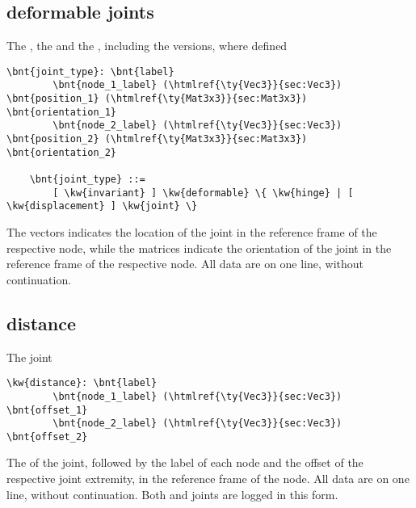 \subsection{deformable joints}
The , the 
and the , including the 
versions, where defined
\begin{Verbatim}[commandchars=\\\{\}]
    \bnt{joint_type}: \bnt{label}
        \bnt{node_1_label} (\htmlref{\ty{Vec3}}{sec:Vec3}) \bnt{position_1} (\htmlref{\ty{Mat3x3}}{sec:Mat3x3}) \bnt{orientation_1}
        \bnt{node_2_label} (\htmlref{\ty{Vec3}}{sec:Vec3}) \bnt{position_2} (\htmlref{\ty{Mat3x3}}{sec:Mat3x3}) \bnt{orientation_2}

    \bnt{joint_type} ::=
        [ \kw{invariant} ] \kw{deformable} \{ \kw{hinge} | [ \kw{displacement} ] \kw{joint} \}
\end{Verbatim}
The  vectors indicates the location of the joint
in the reference frame of the respective node,
while the  matrices indicate the orientation of the joint
in the reference frame of the respective node.
All data are on one line, without continuation.

\subsection{distance}
The  joint
\begin{Verbatim}[commandchars=\\\{\}]
    \kw{distance}: \bnt{label}
        \bnt{node_1_label} (\htmlref{\ty{Vec3}}{sec:Vec3}) \bnt{offset_1}
        \bnt{node_2_label} (\htmlref{\ty{Vec3}}{sec:Vec3}) \bnt{offset_2}
\end{Verbatim}
The  of the joint, followed by the label of each node
and the offset of the respective joint extremity,
in the reference frame of the node.
All data are on one line, without continuation.
Both  and  joints are logged
in this form.

